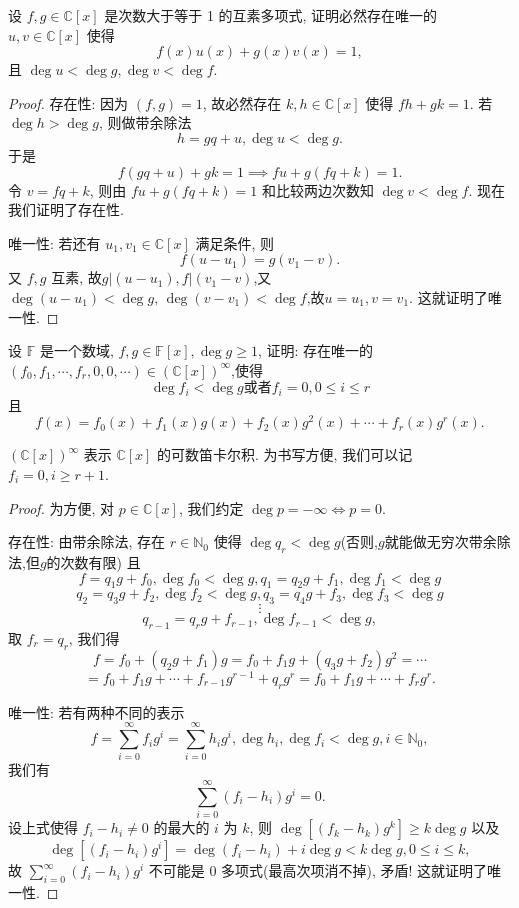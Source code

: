 \documentclass[../../main.tex]{subfiles}%
\begin{document}
\begin{proposition}
设 \( f,g \in \mathbb{C}[x] \) 是次数大于等于 1 的互素多项式, 证明必然存在唯一的 \( u,v \in \mathbb{C}[x] \) 使得
\[
f(x)u(x) + g(x)v(x) = 1,
\]
且 \( \deg u < \deg g, \deg v < \deg f \).
\end{proposition}
\begin{proof}

存在性:
因为 \( (f,g) = 1 \), 故必然存在 \( k,h \in \mathbb{C}[x] \) 使得 \( fh + gk = 1 \). 若 \( \deg h > \deg g \), 则做带余除法
\[
h = gq + u, \deg u < \deg g.
\]
于是
\[
f(gq + u) + gk = 1 \implies fu + g(fq + k) = 1.
\]
令 \( v = fq + k \), 则由 \( fu + g(fq + k) = 1 \) 和比较两边次数知 \( \deg v < \deg f \). 现在我们证明了存在性.

唯一性:
若还有 \( u_1, v_1 \in \mathbb{C}[x] \) 满足条件, 则
\[
f(u - u_1) = g(v_1 - v).
\]
又 \( f,g \) 互素, 故$
g|(u - u_1), f|(v_1 - v)$,又$\deg (u-u_1)<\deg g,\,\deg(v-v_1)<\deg f$,故$u = u_1, v = v_1$.
这就证明了唯一性.

\end{proof}

\begin{example}
设 \( \mathbb{F} \) 是一个数域, \( f,g \in \mathbb{F}[x], \deg g \geqslant 1 \), 证明: 存在唯一的 \( (f_0,f_1,\cdots,f_r,0,0,\cdots) \in (\mathbb{C}[x])^\infty \),使得
\[
\deg f_i < \deg g \text{或者} f_i = 0, 0 \leqslant i \leqslant r
\]
且
\[
f(x) = f_0(x) + f_1(x)g(x) + f_2(x)g^2(x) + \cdots + f_r(x)g^r(x).
\]
\end{example}
\begin{remark}
\( (\mathbb{C}[x])^\infty \) 表示 \( \mathbb{C}[x] \) 的可数笛卡尔积. 为书写方便, 我们可以记 \( f_i = 0, i \geqslant r + 1 \).
\end{remark}
\begin{proof}

为方便, 对 \( p \in \mathbb{C}[x] \), 我们约定 \( \deg p = -\infty \Leftrightarrow p = 0 \).

存在性:
由带余除法, 存在 \( r \in \mathbb{N}_0 \) 使得 \( \deg q_r < \deg g \)(否则,$g$就能做无穷次带余除法,但$g$的次数有限) 且
\[
f = q_1g + f_0, \deg f_0 < \deg g, q_1 = q_2g + f_1, \deg f_1 < \deg g
\]
\[
q_2 = q_3g + f_2, \deg f_2 < \deg g, q_3 = q_4g + f_3, \deg f_3 < \deg g
\]
\[
\vdots
\]
\[
q_{r-1} = q_r g + f_{r-1}, \deg f_{r-1} < \deg g,
\]
取 \( f_r = q_r \), 我们得
\[
f = f_0 + (q_2g + f_1)g = f_0 + f_1g + (q_3g + f_2)g^2 = \cdots
\]
\[
= f_0 + f_1g + \cdots + f_{r-1}g^{r-1} + q_r g^r = f_0 + f_1g + \cdots + f_r g^r.
\]

唯一性:
若有两种不同的表示
\[
f = \sum_{i=0}^\infty f_i g^i = \sum_{i=0}^\infty h_i g^i, \deg h_i, \deg f_i < \deg g, i \in \mathbb{N}_0,
\]
我们有
\[
\sum_{i=0}^\infty (f_i - h_i) g^i = 0.
\]
设上式使得 \( f_i - h_i \neq 0 \) 的最大的 \( i \) 为 \( k \), 则 \( \deg [(f_k - h_k) g^k] \geqslant k \deg g \) 以及
\[
\deg [(f_i - h_i) g^i] = \deg (f_i - h_i) + i \deg g < k \deg g, 0 \leqslant i \leqslant k,
\]
故 \( \sum_{i=0}^\infty (f_i - h_i) g^i \) 不可能是 0 多项式(最高次项消不掉), 矛盾! 这就证明了唯一性.

\end{proof}
\end{document}
